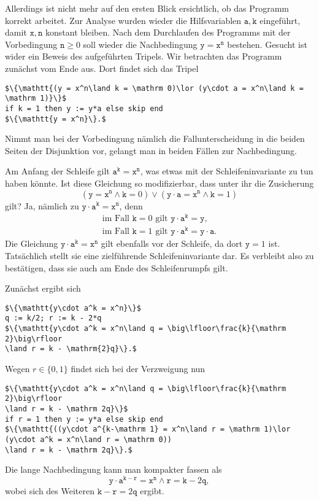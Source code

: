Allerdings ist nicht mehr auf den ersten Blick ersichtlich, ob das
Programm korrekt arbeitet. Zur Analyse wurden wieder die
Hilfsvariablen $\mathtt{a,k}$ eingeführt, damit $\mathtt{x,n}$ konstant
bleiben. Nach dem Durchlaufen des Programms mit der Vorbedingung
$\mathtt n\ge 0$ soll wieder die Nachbedingung $\mathtt{y=x^n}$ bestehen.
Gesucht ist wider ein Beweis des aufgeführten Tripels. Wir betrachten das
Programm zunächst vom Ende aus. Dort findet sich das Tripel
\begin{lstlisting}[language=IMP, xleftmargin=\mathindent, mathescape]
$\{\mathtt{(y = x^n\land k = \mathrm 0)\lor (y\cdot a = x^n\land k = \mathrm 1)}\}$
if k = 1 then y := y*a else skip end
$\{\mathtt{y = x^n}\}.$
\end{lstlisting}
Nimmt man bei der Vorbedingung nämlich die Fallunterscheidung in die
beiden Seiten der Disjunktion vor, gelangt man in beiden Fällen
zur Nachbedingung.

Am Anfang der Schleife gilt $\mathtt{a^k = x^n}$, was etwas mit der
Schleifeninvariante zu tun haben könnte. Ist diese Gleichung so
modifizierbar, dass unter ihr die Zusicherung
\[\mathtt{(y = x^n\land k = \mathrm 0)\lor (y\cdot a = x^n\land k = \mathrm 1)}\]
gilt? Ja, nämlich zu $\mathtt{y\cdot a^k = x^n}$, denn
\begin{gather*}
\text{im Fall $\mathtt k=0$ gilt $\mathtt{y\cdot a^k = y}$},\\
\text{im Fall $\mathtt k=1$ gilt $\mathtt{y\cdot a^k = y\cdot a}$}.
\end{gather*}
Die Gleichung $\mathtt{y\cdot a^k = x^n}$ gilt ebenfalls vor der
Schleife, da dort $\mathtt y = 1$ ist. Tatsächlich stellt sie eine
zielführende Schleifeninvariante dar. Es verbleibt also zu bestätigen,
dass sie auch am Ende des Schleifenrumpfs gilt.

Zunächst ergibt sich
\begin{lstlisting}[language=IMP, xleftmargin=\mathindent, mathescape]
$\{\mathtt{y\cdot a^k = x^n}\}$
q := k/2; r := k - 2*q
$\{\mathtt{y\cdot a^k = x^n\land q = \big\lfloor\frac{k}{\mathrm 2}\big\rfloor
\land r = k - \mathrm{2}q}\}.$
\end{lstlisting}

Wegen $r\in\{0,1\}$ findet sich bei der Verzweigung nun
\begin{lstlisting}[language=IMP, xleftmargin=\mathindent, mathescape]
$\{\mathtt{y\cdot a^k = x^n\land q = \big\lfloor\frac{k}{\mathrm 2}\big\rfloor
\land r = k - \mathrm 2q}\}$
if r = 1 then y := y*a else skip end
$\{\mathtt{((y\cdot a^{k-\mathrm 1} = x^n\land r = \mathrm 1)\lor
(y\cdot a^k = x^n\land r = \mathrm 0))
\land r = k - \mathrm 2q}\}.$
\end{lstlisting}
Die lange Nachbedingung kann man kompakter fassen als
\[\mathtt{y\cdot a^{k - r} = x^n\land r = k - \mathrm 2q},\]
wobei sich des Weiteren $\mathtt{k - r = \mathrm 2q}$ ergibt.

